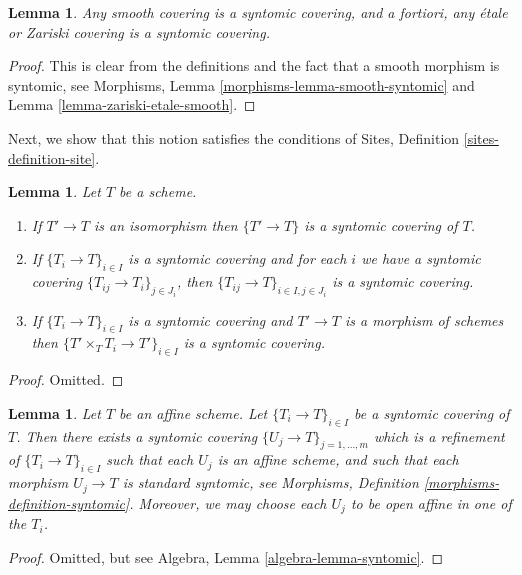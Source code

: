 \documentclass{stacks-project}
\theoremstyle{plain}
\newtheorem{lemma}[subsection]{Lemma}
\theoremstyle{definition}
\theoremstyle{remark}
\numberwithin{equation}{subsection}
\begin{document}
\begin{lemma}
\label{lemma-zariski-etale-smooth-syntomic}
Any smooth covering is a syntomic covering, and a fortiori,
any \'etale or Zariski covering is a syntomic covering.
\end{lemma}

\begin{proof}
This is clear from the definitions and the fact that a smooth
morphism is syntomic, see
Morphisms, Lemma \ref{morphisms-lemma-smooth-syntomic}
and Lemma \ref{lemma-zariski-etale-smooth}.
\end{proof}

\noindent
Next, we show that this notion satisfies the conditions of
Sites, Definition \ref{sites-definition-site}.

\begin{lemma}
\label{lemma-syntomic}
Let $T$ be a scheme.
\begin{enumerate}
\item If $T' \to T$ is an isomorphism then $\{T' \to T\}$
is a syntomic covering of $T$.
\item If $\{T_i \to T\}_{i\in I}$ is a syntomic covering and for each
$i$ we have a syntomic covering $\{T_{ij} \to T_i\}_{j\in J_i}$, then
$\{T_{ij} \to T\}_{i \in I, j\in J_i}$ is a syntomic covering.
\item If $\{T_i \to T\}_{i\in I}$ is a syntomic covering
and $T' \to T$ is a morphism of schemes then
$\{T' \times_T T_i \to T'\}_{i\in I}$ is a syntomic covering.
\end{enumerate}
\end{lemma}

\begin{proof}
Omitted.
\end{proof}

\begin{lemma}
\label{lemma-syntomic-affine}
Let $T$ be an affine scheme.
Let $\{T_i \to T\}_{i \in I}$ be a syntomic covering of $T$.
Then there exists a syntomic covering
$\{U_j \to T\}_{j = 1, \ldots, m}$ which is a refinement
of $\{T_i \to T\}_{i \in I}$ such that each $U_j$ is an affine
scheme, and such that each morphism $U_j \to T$ is standard
syntomic, see Morphisms, Definition \ref{morphisms-definition-syntomic}.
Moreover, we may choose each $U_j$ to be open affine in one of the $T_i$.
\end{lemma}

\begin{proof}
Omitted, but see Algebra, Lemma \ref{algebra-lemma-syntomic}.
\end{proof}
\end{document}
